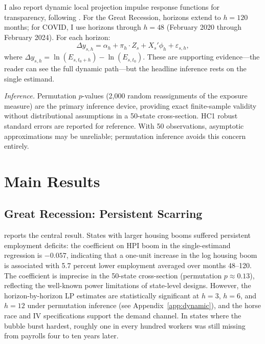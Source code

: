 \documentclass[12pt]{article}
\begin{document}
I also report dynamic local projection impulse response functions for transparency, following \citet{jorda2005estimation}. For the Great Recession, horizons extend to $h = 120$ months; for COVID, I use horizons through $h = 48$ (February 2020 through February 2024). For each horizon:
\begin{equation}
\Delta y_{s,h} = \alpha_h + \pi_h \cdot Z_s + X_s'\phi_h + \varepsilon_{s,h},
\label{eq:lp}
\end{equation}
where $\Delta y_{s,h} = \ln(E_{s,t_0+h}) - \ln(E_{s,t_0})$. These are supporting evidence---the reader can see the full dynamic path---but the headline inference rests on the single estimand.

\textit{Inference.} Permutation $p$-values (2,000 random reassignments of the exposure measure) are the primary inference device, providing exact finite-sample validity without distributional assumptions in a 50-state cross-section. HC1 robust standard errors are reported for reference. With 50 observations, asymptotic approximations may be unreliable; permutation inference avoids this concern entirely.


\section{Main Results}
\label{sec:results}

\subsection{Great Recession: Persistent Scarring}

 reports the central result. States with larger housing booms suffered persistent employment deficits: the coefficient on HPI boom in the single-estimand regression is $-0.057$, indicating that a one-unit increase in the log housing boom is associated with 5.7 percent lower employment averaged over months 48--120. The coefficient is imprecise in the 50-state cross-section (permutation $p \approx 0.13$), reflecting the well-known power limitations of state-level designs. However, the horizon-by-horizon LP estimates are statistically significant at $h = 3$, $h = 6$, and $h = 12$ under permutation inference (see Appendix~\ref{app:dynamic}), and the horse race and IV specifications support the demand channel. In states where the bubble burst hardest, roughly one in every hundred workers was still missing from payrolls four to ten years later.
\end{document}
